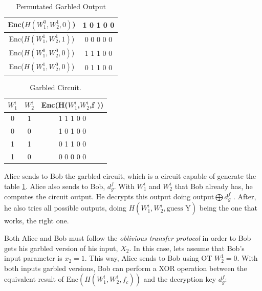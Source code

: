 \begin{refsection}
\begin{table}[H]
    \centering
    \begin{tabular}{|c|c|}
    \hline
    Enc($H(W_1^0,W_2^1,0)$)             &    1 0 1 0 0                                     \\ \hline
    Enc($H(W_1^1,W_2^1,1)$)             &    0 0 0 0 0                                     \\ \hline
    Enc($H(W_1^0,W_2^0,0)$)             &    1 1 1 0 0                                     \\ \hline
    Enc($H(W_1^1,W_2^0,0)$)             &    0 1 1 0 0                                     \\ \hline
    \end{tabular}
    \caption{Permutated Garbled Output}
\end{table}


\begin{table}[H]
    \centering
    \begin{tabular}{|cc|c|}
    \hline
    $W_1^i$ & $W_2^i$   & Enc(H($W_1^i$,$W_2^i$,f ))         \\ \hline
    0       & 1         & 1 1 1 0 0                          \\
    0       & 0         & 1 0 1 0 0                          \\
    1       & 1         & 0 1 1 0 0                          \\
    1       & 0         & 0 0 0 0 0                          \\ \hline
    \end{tabular}
    \caption{Garbled Circuit.}
    \label{tb:summary}
\end{table}
Alice sends to Bob the garbled circuit, which is a circuit capable of generate the table \ref{tb:summary}. Alice also sends to Bob, $d_g^f$. With $W_1^i$  and $W_2^i$ that Bob already has, he computes the circuit output. He decrypts this output doing $\textrm{output} \bigoplus d_g^f$ . After, he also tries all possible outputs, doing $H(W_1^i, W_2^i, \textrm{guess Y})$ being the one that works, the right one.

Both Alice and Bob must follow the \textit{oblivious transfer protocol} in order to Bob gets his garbled version of his input, $X_2$. In this case, lets assume that Bob's input parameter is $x_2=1$. This way, Alice sends to Bob using OT $W_2^1=0$.  With both inputs garbled versions, Bob can perform a \textrm{XOR} operation between the equivalent result of $\textrm{Enc}(H(W_1^i,W_2^i,f_c ))$ and the decryption key $d_g^f$:


\end{refsection}
